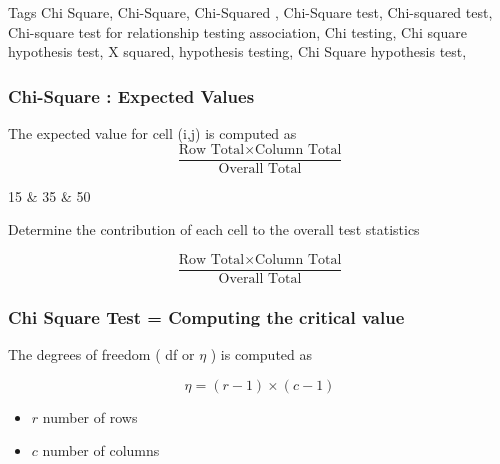 Tags
Chi Square, Chi-Square, Chi-Squared , Chi-Square test, Chi-squared test, Chi-square test for relationship
testing association, Chi testing, Chi square hypothesis test, X squared, hypothesis testing,
Chi Square hypothesis test,


\begin{frame}
\frametitle{Chi-Square : Expected Values}

The expected value for cell (i,j) is computed as
\[  \frac{\mbox{Row Total}\times \mbox{Column Total}}{\mbox{Overall Total}} \]


15 &   35  &  50 


\end{frame}

Determine the contribution of each cell to the overall test statistics


\[  \frac{\mbox{Row Total}\times \mbox{Column Total}}{\mbox{Overall Total}} \]


\begin{frame}
\frametitle{Chi Square Test = Computing the critical value}
The degrees of freedom ( df or $\eta$ ) is computed as

\[ \eta = (r-1)\times(c-1) \]

\begin{itemize}
\item $r$ number of rows
\item $c$ number of columns
\end{itemize}
\end{frame}

